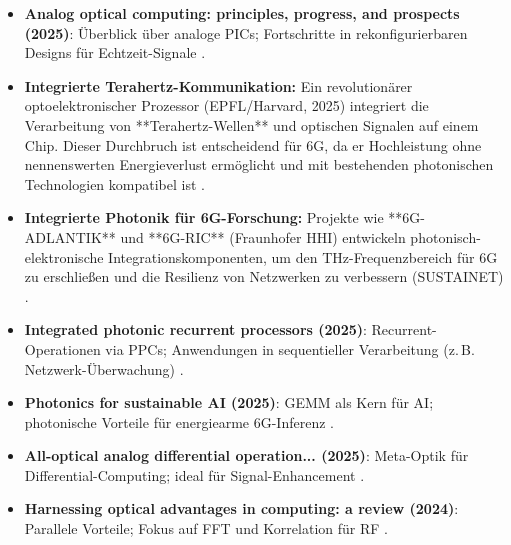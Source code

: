 	\begin{itemize}
		\item \textbf{Analog optical computing: principles, progress, and prospects (2025)}: Überblick über analoge PICs; Fortschritte in rekonfigurierbaren Designs für Echtzeit-Signale \cite{analog_optical}.
		\item \textbf{Integrierte Terahertz-Kommunikation:} Ein revolutionärer optoelektronischer Prozessor (EPFL/Harvard, 2025) integriert die Verarbeitung von **Terahertz-Wellen** und optischen Signalen auf einem Chip. Dieser Durchbruch ist entscheidend für 6G, da er Hochleistung ohne nennenswerten Energieverlust ermöglicht und mit bestehenden photonischen Technologien kompatibel ist \cite{thz_epfl}.
		\item \textbf{Integrierte Photonik für 6G-Forschung:} Projekte wie **6G-ADLANTIK** und **6G-RIC** (Fraunhofer HHI) entwickeln photonisch-elektronische Integrationskomponenten, um den THz-Frequenzbereich für 6G zu erschließen und die Resilienz von Netzwerken zu verbessern (SUSTAINET) \cite{hhi_6g}.
		\item \textbf{Integrated photonic recurrent processors (2025)}: Recurrent-Operationen via PPCs; Anwendungen in sequentieller Verarbeitung (z.\,B. Netzwerk-Überwachung) \cite{recurrent_photonics}.
		\item \textbf{Photonics for sustainable AI (2025)}: GEMM als Kern für AI; photonische Vorteile für energiearme 6G-Inferenz \cite{photonics_ai}.
		\item \textbf{All-optical analog differential operation... (2025)}: Meta-Optik für Differential-Computing; ideal für Signal-Enhancement \cite{differential_optical}.
		\item \textbf{Harnessing optical advantages in computing: a review (2024)}: Parallele Vorteile; Fokus auf FFT und Korrelation für RF \cite{optical_advantages}.
	\end{itemize}
	
